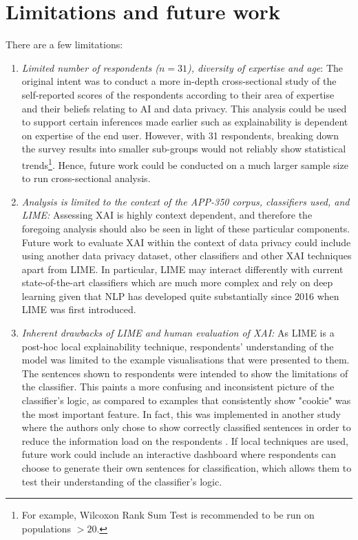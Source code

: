 \section{Limitations and future work}
There are a few limitations:
\begin{enumerate}[listparindent=0.5cm]
    \item \textit{Limited number of respondents ($n = 31$), diversity of expertise and age}: The original intent was to conduct a more in-depth cross-sectional study of the self-reported scores of the respondents according to their area of expertise and their beliefs relating to AI and data privacy. This analysis could be used to support certain inferences made earlier such as explainability is dependent on expertise of the end user. However, with 31 respondents, breaking down the survey results into smaller sub-groups would not reliably show statistical trends\footnote{For example, Wilcoxon Rank Sum Test is recommended to be run on populations $> 20$.}. Hence, future work could be conducted on a much larger sample size to run cross-sectional analysis.
    
    \item \textit{Analysis is limited to the context of the APP-350 corpus, classifiers used, and LIME:} Assessing XAI is highly context dependent, and therefore the foregoing analysis should also be seen in light of these particular components. Future work to evaluate XAI within the context of data privacy could include using another data privacy dataset, other classifiers and other XAI techniques apart from LIME. In particular, LIME may interact differently with current state-of-the-art classifiers which are much more complex and rely on deep learning given that NLP has developed quite substantially since 2016 when LIME was first introduced.
    
    \item \textit{Inherent drawbacks of LIME and human evaluation of XAI:} As LIME is a post-hoc local explainability technique, respondents' understanding of the model was limited to the example visualisations that were presented to them. The sentences shown to respondents were intended to show the limitations of the classifier. This paints a more confusing and inconsistent picture of the classifier's logic, as compared to examples that consistently show "cookie" was the most important feature. In fact, this was implemented in another study where the authors only chose to show correctly classified sentences in order to reduce the information load on the respondents \cite{gorski2021}. If local techniques are used, future work could include an interactive dashboard where respondents can choose to generate their own sentences for classification, which allows them to test their understanding of the classifier's logic.
    

\end{enumerate}
